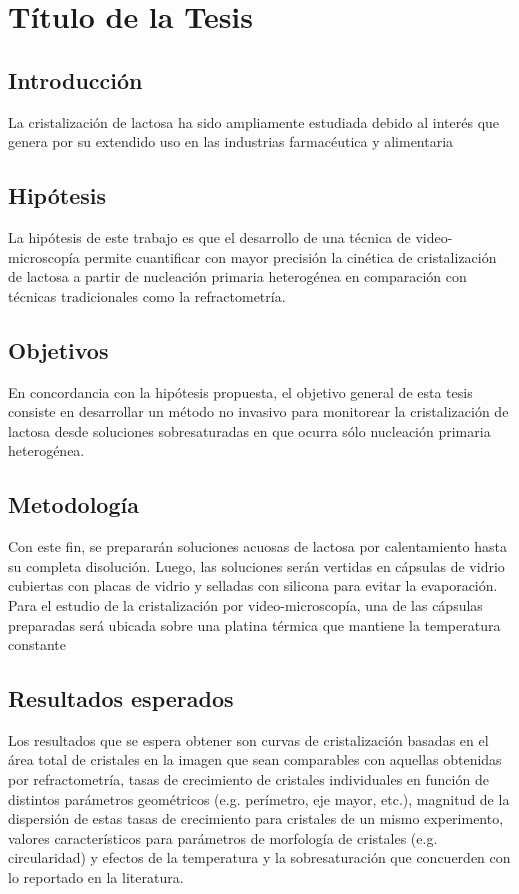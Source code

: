 \section*{Título de la Tesis}

\subsection*{Introducción}


La cristalización de lactosa ha sido ampliamente estudiada debido al interés que genera por su extendido uso en las industrias farmacéutica y alimentaria\cite{haase1966kinetic}


\subsection*{Hipótesis}

La hipótesis de este trabajo es que el desarrollo de una técnica de video-microscopía permite cuantificar con mayor precisión la cinética de cristalización de lactosa a partir de nucleación primaria heterogénea en comparación con técnicas tradicionales como la refractometría.



\subsection*{Objetivos}
En concordancia con la hipótesis propuesta, el objetivo general de esta tesis consiste en desarrollar un método no invasivo para monitorear la cristalización de lactosa desde soluciones sobresaturadas en que ocurra sólo nucleación primaria heterogénea.



\subsection*{Metodología}

Con este fin, se prepararán soluciones acuosas de lactosa por calentamiento hasta su completa disolución. Luego, las soluciones serán vertidas en cápsulas de vidrio cubiertas con placas de vidrio y selladas con silicona para evitar la evaporación. Para el estudio de la cristalización por video-microscopía, una de las cápsulas preparadas será ubicada sobre una platina térmica que mantiene la temperatura constante


\subsection*{Resultados esperados}
Los resultados que se espera obtener son curvas de cristalización basadas en el área total de cristales en la imagen que sean comparables con aquellas obtenidas por refractometría, tasas de crecimiento de cristales individuales en función de distintos parámetros geométricos (e.g. perímetro, eje mayor, etc.), magnitud de la dispersión de estas tasas de crecimiento para cristales de un mismo experimento, valores característicos para parámetros de morfología de cristales (e.g. circularidad) y efectos de la temperatura y la sobresaturación que concuerden con lo reportado en la literatura.